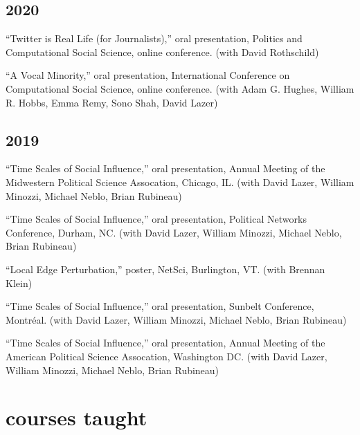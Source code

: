 \documentclass[11pt, letter]{article}
\begin{document}
\subsection{2020}

\begin{hangparas}{.25in}{1}
  ``Twitter is Real Life (for Journalists),'' oral presentation, Politics and
  Computational Social Science, online conference. (with David
  Rothschild)\vspace{2mm}

``A Vocal Minority,'' oral presentation, International Conference on
Computational Social Science, online conference. (with Adam G. Hughes, William
R. Hobbs, Emma Remy, Sono Shah, David Lazer)

\end{hangparas}
\subsection{2019}

\begin{hangparas}{.25in}{1}
  ``Time Scales of Social Influence,'' oral presentation, Annual Meeting of the
  Midwestern Political Science Assocation, Chicago, IL. (with David Lazer,
  William Minozzi, Michael Neblo, Brian Rubineau)\vspace{2mm}

``Time Scales of Social Influence,'' oral presentation, Political Networks
Conference, Durham, NC. (with David Lazer, William Minozzi, Michael Neblo, Brian
Rubineau)\vspace{2mm}

``Local Edge Perturbation,'' poster, NetSci, Burlington, VT. (with Brennan
Klein)\vspace{2mm}

``Time Scales of Social Influence,'' oral presentation, Sunbelt Conference,
Montréal. (with David Lazer, William Minozzi, Michael Neblo, Brian
Rubineau)\vspace{2mm}

``Time Scales of Social Influence,'' oral presentation, Annual Meeting of the
American Political Science Assocation, Washington DC. (with David Lazer, William
Minozzi, Michael Neblo, Brian Rubineau)\vspace{2mm}

\end{hangparas}

\vspace{2mm}
\section{courses taught}
\end{document}
